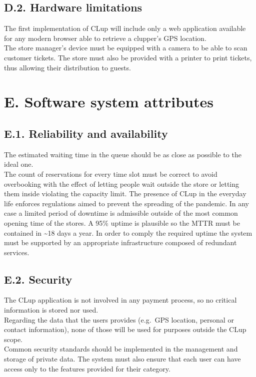 \subsection{D.2. Hardware limitations}

The first implementation of CLup will include only a web application available for any modern browser able to retrieve a clupper's GPS location.\\
The store manager's device must be equipped with a camera to be able to scan customer tickets. The store must also be provided with a printer to print tickets, thus allowing their distribution to guests.

\clearpage
\section{E. Software system attributes}

\subsection{E.1. Reliability and availability}

The estimated waiting time in the queue should be as close as possible to the ideal one.\\
The count of reservations for every time slot must be correct to avoid overbooking with the effect of letting people wait outside the store or letting them inside violating the capacity limit. The presence of CLup in the everyday life enforces regulations aimed to prevent the spreading of the pandemic. In any case a limited period of downtime is admissible outside of the most common opening time of the stores. A 95\% uptime is plausible so the MTTR must be contained in \textasciitilde18 days a year. In order to comply the required uptime the system must be supported by an appropriate infrastructure composed of redundant services.

\subsection{E.2. Security}

The CLup application is not involved in any payment process, so no critical information is stored nor used.\\
Regarding the data that the users provides (e.g.~GPS location, personal or contact information), none of those will be used for purposes outside the CLup scope.\\
Common security standards should be implemented in the management and storage of private data. The system must also ensure that each user can have access only to the features provided for their category.

